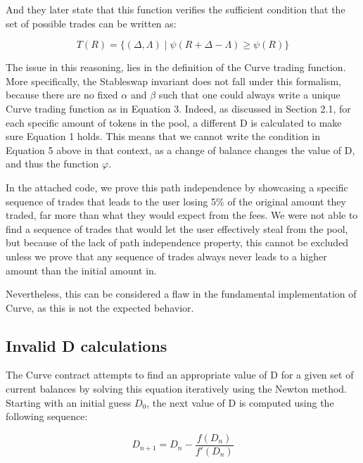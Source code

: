 \documentclass{article}
\begin{document}
    And they later state that this function verifies the sufficient condition that the set of possible trades can be written as: 

    \begin{equation}
        T(R)=\{(\Delta, \Lambda) \mid \psi(R+\Delta-\Lambda) \geq \psi(R)\}
    \end{equation}

    The issue in this reasoning, lies in the definition of the Curve trading function. More specifically, the Stableswap invariant does not fall under this formalism, because there are no fixed $\alpha$ and $\beta$ such that one could always write a unique Curve trading function as in Equation 3. Indeed, as discussed in Section 2.1, for each specific amount of tokens in the pool, a different D is calculated to make sure Equation 1 holds. This means that we cannot write the condition in Equation 5 above in that context, as a change of balance changes the value of D, and thus the function $\varphi$. 

    In the attached code, we prove this path independence by showcasing a specific sequence of trades that leads to the user losing 5\% of the original amount they traded, far more than what they would expect from the fees. We were not able to find a sequence of trades that would let the user effectively steal from the pool, but because of the lack of path independence property, this cannot be excluded unless we prove that any sequence of trades always never leads to a higher amount than the initial amount in.

    Nevertheless, this can be considered a flaw in the fundamental implementation of Curve, as this is not the expected behavior. 

    \subsection{Invalid D calculations}
    
    The Curve contract attempts to find an appropriate value of D for a given set of current balances by solving this equation iteratively using the Newton method. Starting with an initial guess $D_{0}$, the next value of D is computed using the following sequence: 

    \begin{equation}
        D_{n+1} = D_{n} - \frac{f(D_{n})}{f'(D_{n})}
    \end{equation}
\end{document}
